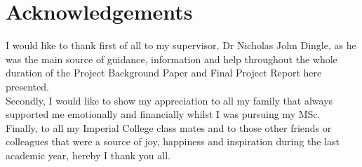 \chapter*{Acknowledgements}

I would like to thank first of all to my supervisor, Dr Nicholas John Dingle, as he was the main source of guidance, information and help throughout the whole duration of the Project Background Paper and Final Project Report here presented.\\

Secondly, I would like to show my appreciation to all my family that always supported me emotionally and financially whilst I was pursuing my MSc.\\

Finally, to all my Imperial College class mates and to those other friends or colleagues that were a source of joy, happiness and inspiration during the last academic year, hereby I thank you all.\\

\addtocounter{page}{-1}
